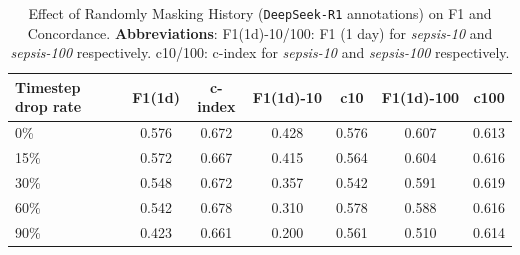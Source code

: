 \begin{table}[htbp]
\caption{Effect of Randomly Masking History (\texttt{DeepSeek-R1} annotations) on F1 and Concordance. \textbf{Abbreviations}: F1(1d)-10/100: F1 (1 day) for \textit{sepsis-10} and \textit{sepsis-100} respectively. c10/100: c-index for \textit{sepsis-10} and \textit{sepsis-100} respectively.}
\ChSevenTableBodyStart
\begin{ChSevenFloatBody}

    \centering
    \begin{tabular}{lcccccc}
        \toprule
        \textbf{Timestep drop rate} & F1(1d) & c-index & F1(1d)-10 & c10 & F1(1d)-100 & c100 \\
        \hline
        0\%  & 0.576 & 0.672 & 0.428 & 0.576 & 0.607 & 0.613 \\
        15\% & 0.572 & 0.667 & 0.415 & 0.564 & 0.604 & 0.616 \\
        30\% & 0.548 & 0.672 & 0.357 & 0.542 & 0.591 & 0.619 \\
        60\% & 0.542 & 0.678 & 0.310 & 0.578 & 0.588 & 0.616 \\
        90\% & 0.423 & 0.661 & 0.200 & 0.561 & 0.510 & 0.614 \\
        \bottomrule
    \end{tabular}
    
    

\end{ChSevenFloatBody}
\end{table}